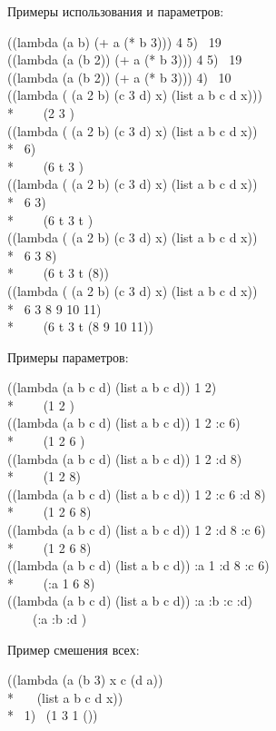 \noindent
Примеры использования  и  параметров:
\begin{lisp}
((lambda (a b) (+ a (* b 3))) 4 5) \EV\ 19 \\
((lambda (a  (b 2)) (+ a (* b 3))) 4 5) \EV\ 19 \\
((lambda (a  (b 2)) (+ a (* b 3))) 4) \EV\ 10 \\
((lambda ( (a 2 b) (c 3 d)  x) (list a b c d x))) \\*
~~~\EV\ (2 {\false} 3 {\false} {\false}) \\
((lambda ( (a 2 b) (c 3 d)  x) (list a b c d x)) \\*
~6) \\*
~~~\EV\ (6 t 3 {\false} {\false}) \\
((lambda ( (a 2 b) (c 3 d)  x) (list a b c d x)) \\*
~6 3) \\*
~~~\EV\ (6 t 3 t {\false}) \\
((lambda ( (a 2 b) (c 3 d)  x) (list a b c d x)) \\*
~6 3 8) \\*
~~~\EV\ (6 t 3 t (8)) \\
((lambda ( (a 2 b) (c 3 d)  x) (list a b c d x)) \\*
~6 3 8 9 10 11) \\*
~~~\EV\ (6 t 3 t (8 9 10 11))
\end{lisp}
Примеры  параметров:
\begin{lisp}
((lambda (a b  c d) (list a b c d)) 1 2) \\*
~~~\EV\ (1 2 {\nil} {\nil}) \\
((lambda (a b  c d) (list a b c d)) 1 2 :c 6) \\*
~~~\EV\ (1 2 6 {\nil}) \\
((lambda (a b  c d) (list a b c d)) 1 2 :d 8) \\*
~~~\EV\ (1 2 {\nil} 8) \\
((lambda (a b  c d) (list a b c d)) 1 2 :c 6 :d 8) \\*
~~~\EV\ (1 2 6 8) \\
((lambda (a b  c d) (list a b c d)) 1 2 :d 8 :c 6) \\*
~~~\EV\ (1 2 6 8) \\
((lambda (a b  c d) (list a b c d)) :a 1 :d 8 :c 6) \\*
~~~\EV\ (:a 1 6 8) \\
((lambda (a b  c d) (list a b c d)) :a :b :c :d) \\
~~~\EV\ (:a :b :d {\nil})
\end{lisp}
Пример смешения всех:
\begin{lisp}
((lambda (a  (b 3)  x  c (d a)) \\*
~~~(list a b c d x)) \\*
~1)   \EV\ (1 3 {\nil} 1 ())
\end{lisp}

